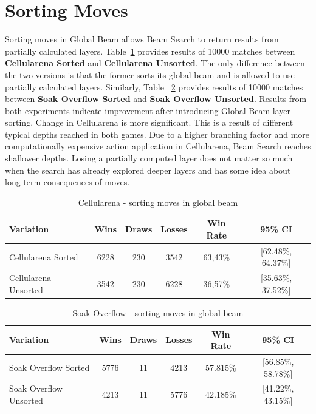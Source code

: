 \documentclass[shortabstract, mgr, english]{iithesis}
\begin{document}
\section{Sorting Moves}
Sorting moves in Global Beam allows Beam Search to return results from partially calculated layers. Table~\ref{tab:CellularenaMoveSorting} provides results of 10000 matches between \textbf{Cellularena Sorted} and \textbf{Cellularena Unsorted}. The only difference between the two versions is that the former sorts its global beam and is allowed to use partially calculated layers. Similarly, Table ~\ref{tab:SoakOverflowMoveSorting} provides results of 10000 matches between \textbf{Soak Overflow Sorted} and \textbf{Soak Overflow Unsorted}.
Results from both experiments indicate improvement after introducing Global Beam layer sorting. Change in Cellularena is more significant. This is a result of different typical depths reached in both games. Due to a higher branching factor and more computationally expensive action application in Cellularena, Beam Search reaches shallower depths. Losing a partially computed layer does not matter so much when the search has already explored deeper layers and has some idea about long-term consequences of moves.

\label{sec:ExperimentsMoveSorting}
\begin{table}[H]
\centering
\begin{tabular}{lccccc}
\toprule
\textbf{Variation} & \textbf{Wins} & \textbf{Draws} & \textbf{Losses} & \textbf{Win Rate} & \textbf{95\% CI} \\
\midrule
Cellularena Sorted    & 6228 & 230 & 3542 & 63,43\% & [62.48\%, 64.37\%]\\
Cellularena Unsorted  & 3542 & 230 & 6228 & 36,57\% & [35.63\%, 37.52\%]\\
\bottomrule
\end{tabular}
\caption{Cellularena - sorting moves in global beam}
\label{tab:CellularenaMoveSorting}
\end{table}

\begin{table}[H]
\centering
\begin{tabular}{lccccc}
\toprule
\textbf{Variation} & \textbf{Wins} & \textbf{Draws} & \textbf{Losses} & \textbf{Win Rate} & \textbf{95\% CI} \\
\midrule
Soak Overflow Sorted    & 5776 & 11 & 4213 & 57.815\% & [56.85\%, 58.78\%]\\
Soak Overflow Unsorted  & 4213 & 11 & 5776 & 42.185\% & [41.22\%, 43.15\%]\\
\bottomrule
\end{tabular}
\caption{Soak Overflow - sorting moves in global beam}
\label{tab:SoakOverflowMoveSorting}
\end{table}
\end{document}
